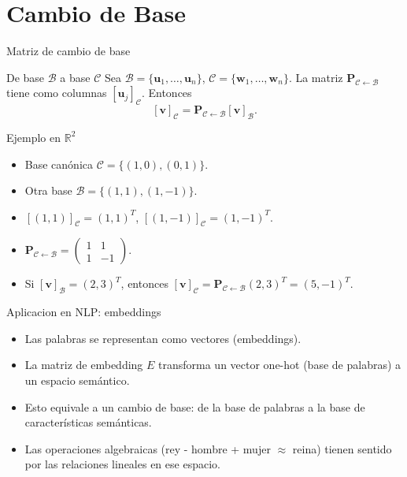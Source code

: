 \documentclass[aspectratio=169, 10pt, xcolor=table]{beamer}
\begin{document}
\section{Cambio de Base}

\begin{frame}{Matriz de cambio de base}
    \begin{block}{De base $\mathcal{B}$ a base $\mathcal{C}$}
        Sea $\mathcal{B}=\{\mathbf{u}_1,\dots,\mathbf{u}_n\}$, $\mathcal{C}=\{\mathbf{w}_1,\dots,\mathbf{w}_n\}$. La matriz $\mathbf{P}_{\mathcal{C}\leftarrow\mathcal{B}}$ tiene como columnas $[\mathbf{u}_j]_{\mathcal{C}}$. Entonces
        \[
        [\mathbf{v}]_{\mathcal{C}} = \mathbf{P}_{\mathcal{C}\leftarrow\mathcal{B}} [\mathbf{v}]_{\mathcal{B}}.
        \]
    \end{block}
\end{frame}

\begin{frame}{Ejemplo en $\mathbb{R}^2$}
    \begin{itemize}
        \item Base canónica $\mathcal{C} = \{(1,0),(0,1)\}$.
        \item Otra base $\mathcal{B} = \{(1,1),(1,-1)\}$.
        \item $[(1,1)]_{\mathcal{C}} = (1,1)^T$, $[(1,-1)]_{\mathcal{C}} = (1,-1)^T$.
        \item $\mathbf{P}_{\mathcal{C}\leftarrow\mathcal{B}} = \begin{pmatrix}1&1\\1&-1\end{pmatrix}$.
        \item Si $[\mathbf{v}]_{\mathcal{B}} = (2,3)^T$, entonces $[\mathbf{v}]_{\mathcal{C}} = \mathbf{P}_{\mathcal{C}\leftarrow\mathcal{B}}(2,3)^T = (5,-1)^T$.
    \end{itemize}
\end{frame}

\begin{frame}{Aplicacion en NLP: embeddings}
    \begin{itemize}
        \item Las palabras se representan como vectores (embeddings).
        \item La matriz de embedding $E$ transforma un vector one-hot (base de palabras) a un espacio semántico.
        \item Esto equivale a un cambio de base: de la base de palabras a la base de características semánticas.
        \item Las operaciones algebraicas (rey - hombre + mujer $\approx$ reina) tienen sentido por las relaciones lineales en ese espacio.
    \end{itemize}
\end{frame}
\end{document}
